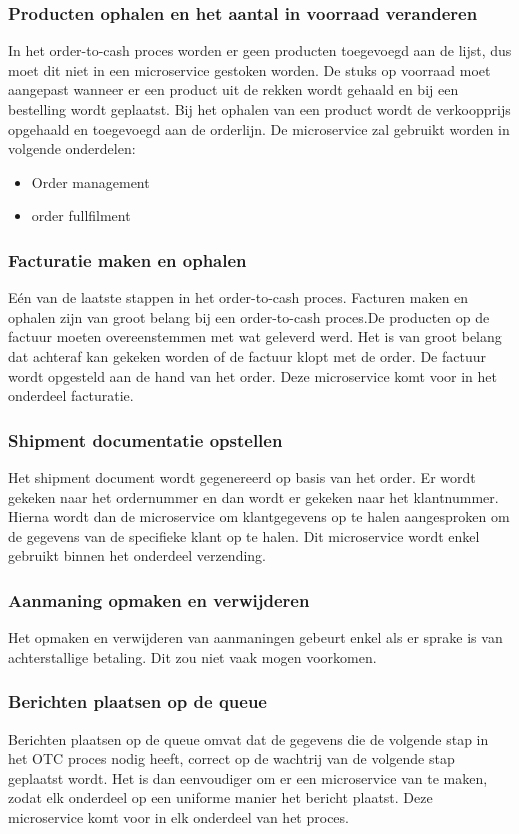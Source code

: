 \subsubsection{Producten ophalen en het aantal in voorraad veranderen}
In het order-to-cash proces worden er geen producten toegevoegd aan de lijst, dus moet dit niet in een microservice gestoken worden. De stuks op voorraad moet aangepast wanneer er een product uit de rekken wordt gehaald en bij een bestelling wordt geplaatst. Bij het ophalen van een product wordt de verkoopprijs opgehaald en toegevoegd aan de orderlijn.
De microservice zal gebruikt worden in volgende onderdelen:
\begin{itemize}
	\item Order management
	\item order fullfilment
\end{itemize}

\subsubsection{Facturatie maken en ophalen}
Eén van de laatste stappen in het order-to-cash proces. Facturen maken en ophalen zijn van groot belang bij een order-to-cash proces.De producten op de factuur moeten overeenstemmen met wat geleverd werd. Het is van groot belang dat achteraf kan gekeken worden of de factuur klopt met de order. De factuur wordt opgesteld aan de hand van het order. 
Deze microservice komt voor in het onderdeel facturatie.

\subsubsection{Shipment documentatie opstellen}
Het shipment document wordt gegenereerd op basis van het order. Er wordt gekeken naar het ordernummer en dan wordt er gekeken naar het klantnummer. Hierna wordt dan de microservice om klantgegevens op te halen aangesproken om de gegevens van de specifieke klant op te halen. Dit microservice wordt enkel gebruikt binnen het onderdeel verzending.

\subsubsection{Aanmaning opmaken en verwijderen}
Het opmaken en verwijderen van aanmaningen gebeurt enkel als er sprake is van achterstallige betaling. Dit zou niet vaak mogen voorkomen. 

\subsubsection{Berichten plaatsen op de queue}
Berichten plaatsen op de queue omvat dat de gegevens die de volgende stap in het OTC proces nodig heeft, correct op de wachtrij van de volgende stap geplaatst wordt.  Het is dan eenvoudiger om er een microservice van te maken, zodat elk onderdeel op een uniforme manier het bericht plaatst. 
Deze microservice komt voor in elk onderdeel van het proces.


